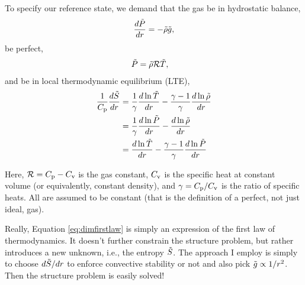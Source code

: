 \documentclass[12pt]{article}
\numberwithin{equation}{section}
\begin{document}
	To specify our reference state, we demand that the gas be in hydrostatic balance,
	\begin{align}\label{eq:dimhydro}
	\frac{d\tilde{P}}{dr}= -\tilde{\rho} \tilde{g},
	\end{align}
	be perfect,
	\begin{align}
	\tilde{P} &= \tilde{\rho}\mathcal{R} \tilde{T},\label{eq:dimidgas}
	\end{align}
	and be in local thermodynamic equilibrium (LTE), 
	\begin{subequations}\label{eq:dimfirstlaw}
	\begin{align}
		\frac{1}{C_{\rm{p}}}\frac{d\tilde{S}}{dr}&=\frac{1}{\gamma}\frac{d\ln\tilde{T}}{dr} - \frac{\gamma - 1}{\gamma}\frac{d\ln\tilde{\rho}}{dr}\label{eq:dimfirstlawtmprho}\\
		&=\frac{1}{\gamma}\frac{d\ln\tilde{P}}{dr} - \frac{d\ln\tilde{\rho}}{dr}\label{eq:dimfirstlawprsrho}\\
		&= \frac{d\ln\tilde{T}}{dr} - \frac{\gamma - 1}{\gamma}\frac{d\ln\tilde{P}}{dr}\label{eq:dimfirstlawtmpprs}
	\end{align}
	\label{eq:firstlaw3}
\end{subequations}

Here, $\mathcal{R}=C_{\rm{p}}-C_{\rm{v}}$ is the gas constant, $C_{\rm{v}}$ is the specific heat at constant volume (or equivalently, constant density), and $\gamma=C_{\rm{p}}/C_{\rm{v}}$ is the ratio of specific heats. All are assumed to be constant (that is the definition of a perfect, not just ideal, gas). 

Really, Equation \eqref{eq:dimfirstlaw} is simply an expression of the first law of thermodynamics. It doesn't further constrain the structure problem, but rather introduces a new unknown, i.e., the entropy $\tilde{S}$. The approach I employ is simply to choose $d\tilde{S}/dr$ to enforce convective stability or not and also pick $\tilde{g}\propto1/r^2$. Then the structure problem is easily solved!
\end{document}

